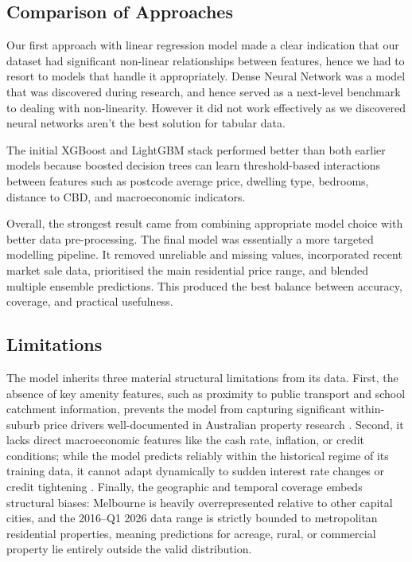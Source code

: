 \documentclass[a4paper,12pt]{article}
\begin{document}
\subsection{Comparison of Approaches}

Our first approach with linear regression model made a clear indication that our dataset had significant non-linear relationships between features, hence we had to resort to models that handle it appropriately. Dense Neural Network was a model that was discovered during research, and hence served as a next-level benchmark to dealing with non-linearity. However it did not work effectively as we discovered neural networks aren't the best solution for tabular data.

The initial XGBoost and LightGBM stack performed better than both earlier models because boosted decision trees can learn threshold-based interactions between features such as postcode average price, dwelling type, bedrooms, distance to CBD, and macroeconomic indicators. 

Overall, the strongest result came from combining appropriate model choice with better data pre-processing. The final model was essentially a more targeted modelling pipeline. It removed unreliable and missing values, incorporated recent market sale data, prioritised the main residential price range, and blended multiple ensemble predictions. This produced the best balance between accuracy, coverage, and practical usefulness.


\subsection{Limitations}
The model inherits three material structural limitations from its data. First, the absence of key amenity features, such as proximity to public transport and school catchment information, prevents the model from capturing significant within-suburb price drivers well-documented in Australian property research \cite{sirmans2005hedonic}. Second, it lacks direct macroeconomic features like the cash rate, inflation, or credit conditions; while the model predicts reliably within the historical regime of its training data, it cannot adapt dynamically to sudden interest rate changes or credit tightening \cite{kearns2022rba}. Finally, the geographic and temporal coverage embeds structural biases: Melbourne is heavily overrepresented relative to other capital cities, and the 2016--Q1 2026 data range is strictly bounded to metropolitan residential properties, meaning predictions for acreage, rural, or commercial property lie entirely outside the valid distribution.
\end{document}

